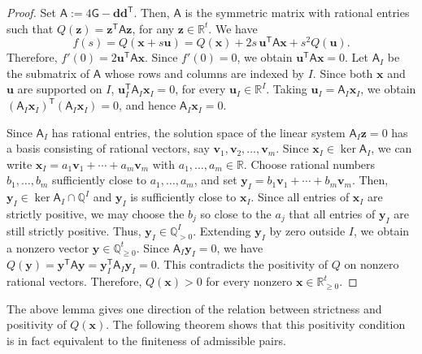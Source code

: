 \documentclass[a4,12pt]{amsart}
\numberwithin{equation}{section} %
\theoremstyle{definition} %
\begin{document}
\begin{proof}
Set $\mathsf{A}:=4\mathsf{G}-\mathbf{d}\mathbf{d}^{\mathsf{T}}$. Then, $\mathsf{A}$ is the symmetric matrix with rational entries such that $Q(\mathbf{z})=\mathbf{z}^{\mathsf{T}}\mathsf{A}\mathbf{z}$, for any $\mathbf{z}\in\mathbb{R}^t$. We have
\[
f(s)=Q(\mathbf{x}+s\mathbf{u})
=
Q(\mathbf{x})+2s\,\mathbf{u}^{\mathsf{T}}\mathsf{A}\mathbf{x}+s^2Q(\mathbf{u}).
\]
Therefore, $f'(0)=2\mathbf{u}^{\mathsf{T}}\mathsf{A}\mathbf{x}$. Since $f'(0)=0$, we obtain $\mathbf{u}^{\mathsf{T}}\mathsf{A}\mathbf{x}=0$. Let $\mathsf{A}_I$ be the submatrix of $\mathsf{A}$ whose rows and columns are indexed by $I$. Since both $\mathbf{x}$ and $\mathbf{u}$ are supported on $I$, $\mathbf{u}_I^{\mathsf{T}}\mathsf{A}_I\mathbf{x}_I=0$, for every $\mathbf{u}_I\in\mathbb{R}^I$. Taking $\mathbf{u}_I=\mathsf{A}_I\mathbf{x}_I$, we obtain $(\mathsf{A}_I\mathbf{x}_I)^{\mathsf{T}}(\mathsf{A}_I\mathbf{x}_I)=0$, and hence $\mathsf{A}_I\mathbf{x}_I=0$.

Since $\mathsf{A}_I$ has rational entries, the solution space of the linear system $\mathsf{A}_I\mathbf{z}=0$ has a basis consisting of rational vectors, say $\mathbf{v}_1,\mathbf{v}_2,\ldots,\mathbf{v}_m$. Since $\mathbf{x}_I\in\ker\mathsf{A}_I$, we can write $\mathbf{x}_I=a_1\mathbf{v}_1+\cdots+a_m\mathbf{v}_m$ with $a_1,\ldots,a_m\in\mathbb{R}$. Choose rational numbers $b_1,\ldots,b_m$ sufficiently close to $a_1,\ldots,a_m$, and set $\mathbf{y}_I=b_1\mathbf{v}_1+\cdots+b_m\mathbf{v}_m$. Then, $\mathbf{y}_I\in\ker\mathsf{A}_I\cap\mathbb{Q}^I$ and $\mathbf{y}_I$ is sufficiently close to $\mathbf{x}_I$. Since all entries of $\mathbf{x}_I$ are strictly positive, we may choose the $b_j$ so close to the $a_j$ that all entries of $\mathbf{y}_I$ are still strictly positive. Thus, $\mathbf{y}_I\in\mathbb{Q}_{>0}^I$. Extending $\mathbf{y}_I$ by zero outside $I$, we obtain a nonzero vector $\mathbf{y}\in\mathbb{Q}_{\geq 0}^t$. Since $\mathsf{A}_I\mathbf{y}_I=0$, we have $Q(\mathbf{y})=\mathbf{y}^{\mathsf{T}}\mathsf{A}\mathbf{y}
=
\mathbf{y}_I^{\mathsf{T}}\mathsf{A}_I\mathbf{y}_I
=0$. This contradicts the positivity of $Q$ on nonzero rational vectors. Therefore, $Q(\mathbf{x})>0$ for every nonzero $\mathbf{x}\in\mathbb{R}_{\geq 0}^t$. 
\end{proof}

The above lemma gives one direction of the relation between strictness and positivity of $Q(\mathbf{x})$. The following theorem shows that this positivity condition is in fact equivalent to the finiteness of admissible pairs.
\end{document}
